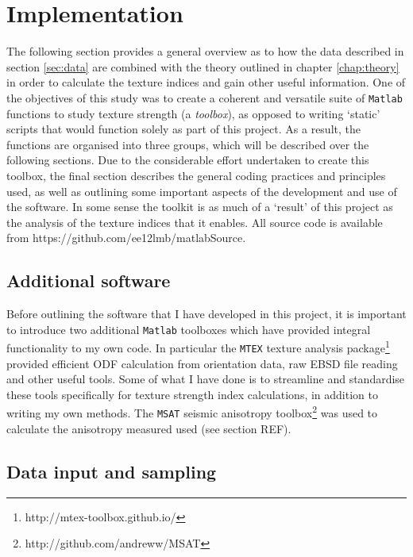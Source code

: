 \documentclass[a4paper,12pt]{report}
\numberwithin{equation}{chapter}
\begin{document}
\section{Implementation}

The following section provides a general overview as to how the data described in section \ref{sec:data} are combined with the theory outlined in chapter \ref{chap:theory} in order to calculate the texture indices and gain other useful information. One of the objectives of this study was to create a coherent and versatile suite of \texttt{Matlab} functions to study texture strength (a \emph{toolbox}), as opposed to writing \lq{}static\rq{} scripts that would function solely as part of this project. As a result, the functions are organised into three groups, which will be described over the following sections. Due to the considerable effort undertaken to create this toolbox, the final section describes the general coding practices and principles used, as well as outlining some important aspects of the development and use of the software. In some sense the toolkit is as much of a \lq{}result\rq{} of this project as the analysis of the texture indices that it enables. All source code is available from https://github.com/ee12lmb/matlabSource.                                                                                                     


\subsection{Additional software}
Before outlining the software that I have developed in this project, it is important to introduce two additional \texttt{Matlab} toolboxes which have provided integral functionality to my own code. In particular the \texttt{MTEX} texture analysis package\footnote{http://mtex-toolbox.github.io/} \citep{Bachmann2010,Mainprice} provided efficient ODF calculation from orientation data, raw EBSD file reading and other useful tools. Some of what I have done is to streamline and standardise these tools specifically for texture strength index calculations, in addition to writing my own methods. The \texttt{MSAT} seismic anisotropy toolbox\footnote{http://github.com/andreww/MSAT} was used to calculate the anisotropy measured used (see section REF).    

\subsection{Data input and sampling}
\end{document}
